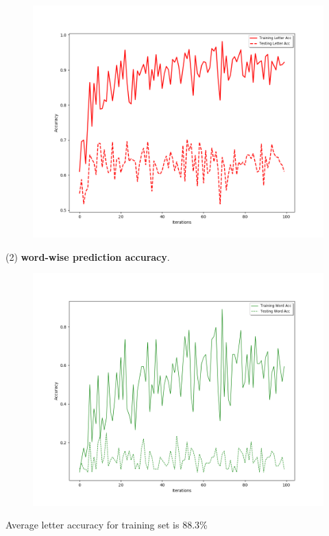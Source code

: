 \documentclass[11pt]{report}
\begin{document}
\begin{itemize}
\begin{figure}[h]
	\includegraphics[width = 15 cm]{./letteraccuracies_4c.png}
	\centering
\end{figure}

(2) \textbf{word-wise prediction accuracy}. 

\begin{figure}[h]
	\includegraphics[width = 15 cm]{./wordaccuracies_4c.png}
	\centering
\end{figure}


Average letter accuracy for training set is 88.3\%


\end{itemize}
\end{document}
